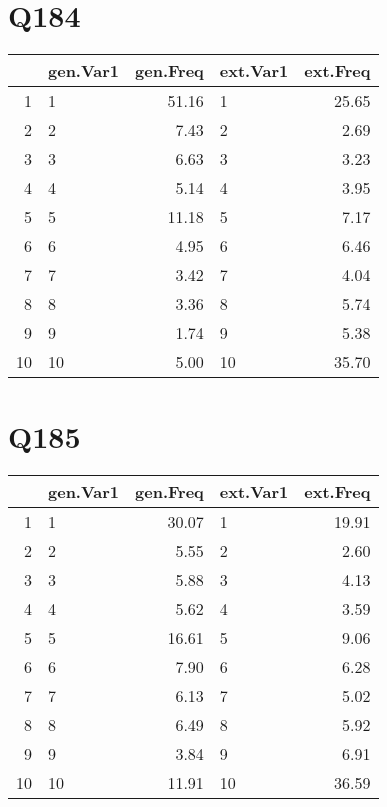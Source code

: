\documentclass{amsart}
\begin{document}
\section{Q184}
\begin{table}[ht]
\centering
\begin{tabular}{rlrlr}
  \hline
 & gen.Var1 & gen.Freq & ext.Var1 & ext.Freq \\ 
  \hline
1 & 1 & 51.16 & 1 & 25.65 \\ 
  2 & 2 & 7.43 & 2 & 2.69 \\ 
  3 & 3 & 6.63 & 3 & 3.23 \\ 
  4 & 4 & 5.14 & 4 & 3.95 \\ 
  5 & 5 & 11.18 & 5 & 7.17 \\ 
  6 & 6 & 4.95 & 6 & 6.46 \\ 
  7 & 7 & 3.42 & 7 & 4.04 \\ 
  8 & 8 & 3.36 & 8 & 5.74 \\ 
  9 & 9 & 1.74 & 9 & 5.38 \\ 
  10 & 10 & 5.00 & 10 & 35.70 \\ 
   \hline
\end{tabular}
\end{table}

\section{Q185}
\begin{table}[ht]
\centering
\begin{tabular}{rlrlr}
  \hline
 & gen.Var1 & gen.Freq & ext.Var1 & ext.Freq \\ 
  \hline
1 & 1 & 30.07 & 1 & 19.91 \\ 
  2 & 2 & 5.55 & 2 & 2.60 \\ 
  3 & 3 & 5.88 & 3 & 4.13 \\ 
  4 & 4 & 5.62 & 4 & 3.59 \\ 
  5 & 5 & 16.61 & 5 & 9.06 \\ 
  6 & 6 & 7.90 & 6 & 6.28 \\ 
  7 & 7 & 6.13 & 7 & 5.02 \\ 
  8 & 8 & 6.49 & 8 & 5.92 \\ 
  9 & 9 & 3.84 & 9 & 6.91 \\ 
  10 & 10 & 11.91 & 10 & 36.59 \\ 
   \hline
\end{tabular}
\end{table}
\end{document}
